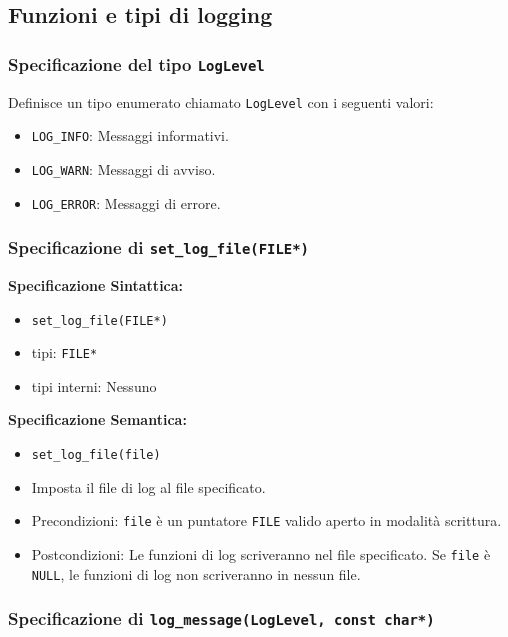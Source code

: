 \documentclass[11pt]{scrartcl} %
\begin{document}
\subsection{Funzioni e tipi di logging}

\subsubsection{Specificazione del tipo \texttt{LogLevel}}

Definisce un tipo enumerato chiamato \texttt{LogLevel} con i seguenti valori:
\begin{itemize}
	\item \texttt{LOG\_INFO}: Messaggi informativi.
	\item \texttt{LOG\_WARN}: Messaggi di avviso.
	\item \texttt{LOG\_ERROR}: Messaggi di errore.
\end{itemize}

\subsubsection{Specificazione di \texttt{set\_log\_file(FILE*)}}

\textbf{Specificazione Sintattica:}
\begin{itemize}
	\item \texttt{set\_log\_file(FILE*)}
	\item tipi: \texttt{FILE*}
	\item tipi interni: Nessuno
\end{itemize}

\textbf{Specificazione Semantica:}
\begin{itemize}
	\item \texttt{set\_log\_file(file)}
	\item Imposta il file di log al file specificato.
	\item Precondizioni: \texttt{file} è un puntatore \texttt{FILE} valido aperto in modalità scrittura.
	\item Postcondizioni: Le funzioni di log scriveranno nel file specificato. Se \texttt{file} è \texttt{NULL}, le funzioni di log non scriveranno in nessun file.
\end{itemize}



\subsubsection{Specificazione di \texttt{log\_message(LogLevel, const char*)}}
\end{document}
